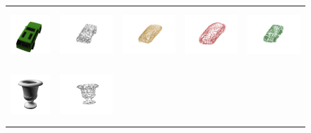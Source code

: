 \documentclass[bachelor, nocolorlinks, printoneside]{seuthesis} %
\begin{document}
\begin{Main}
\begin{figure}[!h]
\begin{tabular}{c@{}c@{}c@{}c@{}c@{}}
    	\vspace{-5mm}
    	\includegraphics[width=0.11\columnwidth,height=2cm]{figs/real_dataset/Image/car_8b049c92888475f67c3c6f82a395b347.png} &
    	\includegraphics[width=0.22\columnwidth,height=2cm]{figs/real_dataset/GT/car_8b049c92888475f67c3c6f82a395b347.png} &
    	\includegraphics[width=0.22\columnwidth,height=2cm]{figs/real_dataset/AE_label/car_8b049c92888475f67c3c6f82a395b347_fine.png} &
    	\includegraphics[width=0.22\columnwidth,height=2cm]{figs/real_dataset/AE/car_8b049c92888475f67c3c6f82a395b347.png} &
    	\includegraphics[width=0.22\columnwidth,height=2cm]{figs/real_dataset/oracle/car_8b049c92888475f67c3c6f82a395b347.png} \\
    	\vspace{-5mm}
    	\includegraphics[width=0.11\columnwidth,height=2cm]{figs/real_dataset/Image/jar_d56098d4d83f5976a2c59a4d90e63212.png} &
    	\includegraphics[width=0.22\columnwidth,height=2cm]{figs/real_dataset/GT/jar_d56098d4d83f5976a2c59a4d90e63212_gt.png} &

\end{tabular}
\end{figure}
\end{Main}
\end{document}
